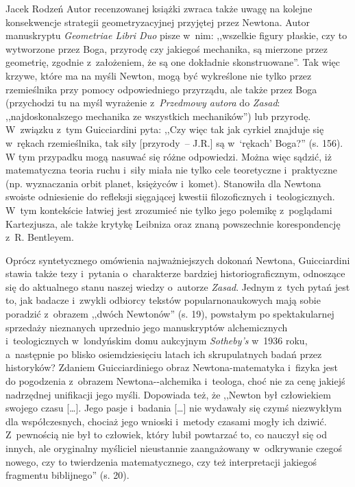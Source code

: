 \begin{recplenv}{Jacek Rodzeń}
Autor recenzowanej książki zwraca także uwagę na kolejne konsekwencje strategii geometryzacyjnej przyjętej przez
Newtona. Autor manuskryptu \textit{Geometriae Libri Duo} pisze w~nim: ,,wszelkie figury płaskie, czy to wytworzone przez
Boga, przyrodę czy jakiegoś mechanika, są mierzone przez geometrię, zgodnie z~założeniem, że są one dokładnie
skonstruowane''. Tak więc krzywe, które ma na myśli Newton, mogą być wykreślone nie tylko przez rzemieślnika przy pomocy
odpowiedniego przyrządu, ale także przez Boga (przychodzi tu na myśl wyrażenie z~\textit{Przedmowy autora} do
\textit{Zasad}: ,,najdoskonalszego mechanika ze wszystkich mechaników'') lub przyrodę. W~związku z~tym Guicciardini pyta:
,,Czy więc tak jak cyrkiel znajduje się w~rękach rzemieślnika, tak siły [przyrody~-- J.R.] są w~‘rękach’ Boga?'' (s. 156).
W tym przypadku mogą nasuwać się różne odpowiedzi. Można więc sądzić, iż matematyczna teoria ruchu i~siły miała nie
tylko cele teoretyczne i~praktyczne (np. wyznaczania orbit planet, księżyców i~komet). Stanowiła dla Newtona swoiste
odniesienie do refleksji sięgającej kwestii filozoficznych i~teologicznych. W~tym kontekście łatwiej jest zrozumieć nie
tylko jego polemikę z~poglądami Kartezjusza, ale także krytykę Leibniza oraz znaną powszechnie
korespondencję z~R. Bentleyem.

Oprócz syntetycznego omówienia najważniejszych dokonań Newtona, Guicciardini stawia także
tezy i~pytania o~charakterze bardziej historiograficznym, odnoszące się do aktualnego stanu naszej
wiedzy o~autorze \textit{Zasad}.
Jednym z~tych pytań jest to, jak badacze i~zwykli odbiorcy tekstów popularnonaukowych mają sobie poradzić z~obrazem
,,dwóch Newtonów'' (s. 19), powstałym po spektakularnej sprzedaży nieznanych uprzednio jego manuskryptów
alchemicznych i~teologicznych w~londyńskim domu aukcyjnym \textit{Sotheby’s} w~1936 roku, a~następnie
po blisko osiemdziesięciu latach
ich skrupulatnych badań przez historyków? Zdaniem Guicciardiniego obraz Newtona-matematyka i~fizyka jest do
pogodzenia z~obrazem
Newtona-\mbox{-alchemika} %
i~teologa, choć nie za cenę jakiejś nadrzędnej unifikacji jego myśli.
Dopowiada też, że
,,Newton był człowiekiem swojego czasu […]. Jego pasje i~badania […] nie wydawały się czymś niezwykłym dla
współczesnych, chociaż jego wnioski i~metody czasami mogły ich dziwić. Z~pewnością nie był to człowiek, który lubił
powtarzać to, co nauczył się od innych, ale oryginalny myśliciel nieustannie zaangażowany w~odkrywanie czegoś nowego,
czy to twierdzenia matematycznego, czy też interpretacji jakiegoś fragmentu biblijnego'' (s. 20). 


\end{recplenv}
